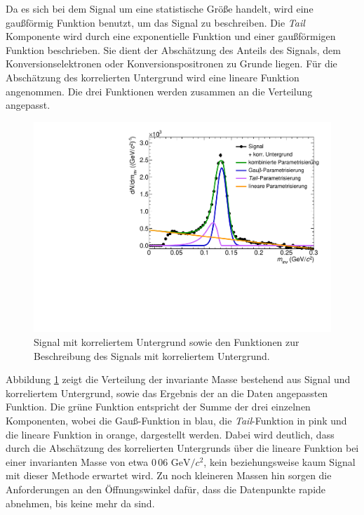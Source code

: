 Da es sich bei dem Signal um eine statistische Größe handelt, wird eine gaußförmig Funktion benutzt, um das Signal zu beschreiben.
\newline
Die \textit{Tail} Komponente wird durch eine exponentielle Funktion und einer gaußförmigen Funktion beschrieben.
Sie dient der Abschätzung des Anteils des Signals, dem Konversionselektronen oder Konversionspositronen zu Grunde liegen.
\newline
Für die Abschätzung des korrelierten Untergrund wird eine lineare Funktion angenommen.
\newline
Die drei Funktionen werden zusammen an die Verteilung angepasst.
\begin{figure}[tp]
\centering
\includegraphics[width=.75\linewidth]{StandardParam.pdf}
\caption{Signal mit korreliertem Untergrund sowie den Funktionen zur Beschreibung des Signals mit korreliertem Untergrund.}
\label{figStandardParam}
\end{figure}
\newline
Abbildung \ref{figStandardParam} zeigt die Verteilung der invariante Masse bestehend aus Signal und korreliertem Untergrund, sowie das Ergebnis der an die Daten angepassten Funktion.
Die grüne Funktion entspricht der Summe der drei einzelnen Komponenten, wobei die Gauß-Funktion in blau, die \textit{Tail}-Funktion in pink und die lineare Funktion in orange, dargestellt werden.
Dabei wird deutlich, dass durch die Abschätzung des korrelierten Untergrunds über die lineare Funktion bei einer invarianten Masse von etwa $0\,06\text{ GeV}/c^{2}$, kein beziehungsweise kaum Signal mit dieser Methode erwartet wird.
Zu noch kleineren Massen hin sorgen die Anforderungen an den Öffnungswinkel dafür, dass die Datenpunkte rapide abnehmen, bis keine mehr da sind.
